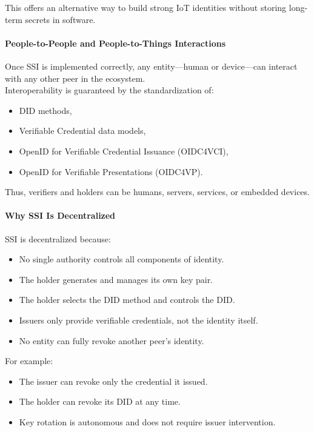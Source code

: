 \noindent
This offers an alternative way to build strong IoT identities without storing long-term secrets in software.

\paragraph{People-to-People and People-to-Things Interactions}
Once SSI is implemented correctly, any entity—human or device—can interact with any other peer in the ecosystem.\\
Interoperability is guaranteed by the standardization of:
\begin{itemize}
    \item DID methods,
    \item Verifiable Credential data models,
    \item OpenID for Verifiable Credential Issuance (OIDC4VCI),
    \item OpenID for Verifiable Presentations (OIDC4VP).
\end{itemize}
\medskip

\noindent
Thus, verifiers and holders can be humans, servers, services, or embedded devices.

\paragraph{Why SSI Is Decentralized}
SSI is decentralized because:
\begin{itemize}
    \item No single authority controls all components of identity.
    \item The holder generates and manages its own key pair.
    \item The holder selects the DID method and controls the DID.
    \item Issuers only provide verifiable credentials, not the identity itself.
    \item No entity can fully revoke another peer's identity.
\end{itemize}

For example:
\begin{itemize}
    \item The issuer can revoke only the credential it issued.
    \item The holder can revoke its DID at any time.
    \item Key rotation is autonomous and does not require issuer intervention.
\end{itemize}
\smallskip

